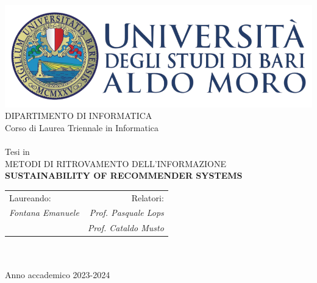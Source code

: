 

\begin{titlepage}
    \begin{center}
        \includegraphics[scale=0.5]{images/uniba-logo.png}\\
        \vspace{1cm}
        {\large DIPARTIMENTO DI INFORMATICA}\\
        \vspace{1cm}
        {\large Corso di Laurea Triennale in Informatica}\\
        \hrulefill \\
        \vspace{1cm}
        {\large Tesi in}\\
        \vspace{0.5cm}
        {\large METODI DI RITROVAMENTO DELL'INFORMAZIONE}\\
        \vspace{1cm}
        {\LARGE \textbf{SUSTAINABILITY OF RECOMMENDER SYSTEMS}}
        \\ %
        \vspace{1cm}

        \vfill
        \centering
        \begin{tabularx}{\textwidth}{@{}Xr@{}}
          {\large Laureando:} & {\large Relatori:} \\ 
          {\large \textit{Fontana Emanuele}} & {\large \textit{Prof. Pasquale Lops}} \\ 
          {} & {\large \textit{Prof. Cataldo Musto}} \\ 
        \end{tabularx}
        \textcolor{white}{.} \\ 
        \vspace{2cm}
        \hrulefill \\
        {\large Anno accademico 2023-2024}
    \end{center}
\end{titlepage}